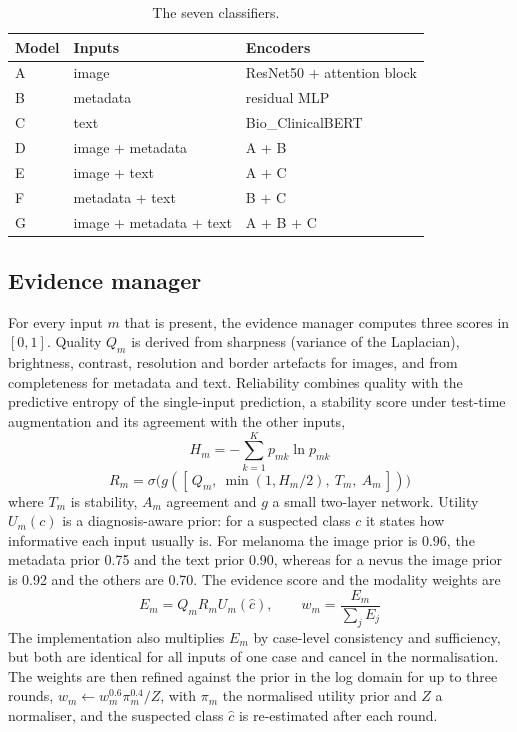 \documentclass[conference]{IEEEtran}
\begin{document}
\begin{table}[!t]
\caption{The seven classifiers.}
\label{tab:models}
\centering\scriptsize\setlength{\tabcolsep}{2.4pt}
\begin{tabular}{lll}
\toprule
Model & Inputs & Encoders \\
\midrule
A & image & ResNet50 + attention block \\
B & metadata & residual MLP \\
C & text & Bio\_ClinicalBERT \\
D & image + metadata & A + B \\
E & image + text & A + C \\
F & metadata + text & B + C \\
G & image + metadata + text & A + B + C \\
\bottomrule
\end{tabular}
\end{table}


\subsection{Evidence manager}
For every input $m$ that is present, the evidence manager computes three scores in $[0,1]$. Quality $Q_m$ is derived from sharpness (variance of the Laplacian), brightness, contrast, resolution and border artefacts for images, and from completeness for metadata and text. Reliability combines quality with the predictive entropy of the single-input prediction, a stability score under test-time augmentation and its agreement with the other inputs,
\begin{equation}
H_m=-\sum_{k=1}^{K}p_{mk}\ln p_{mk}
\label{eq:H}
\end{equation}
\begin{equation}
R_m=\sigma\!\bigl(g([\,Q_m,\ \min(1,H_m/2),\ T_m,\ A_m\,])\bigr)
\label{eq:R}
\end{equation}
where $T_m$ is stability, $A_m$ agreement and $g$ a small two-layer network. Utility $U_m(c)$ is a diagnosis-aware prior: for a suspected class $c$ it states how informative each input usually is. For melanoma the image prior is 0.96, the metadata prior 0.75 and the text prior 0.90, whereas for a nevus the image prior is 0.92 and the others are 0.70. The evidence score and the modality weights are
\begin{equation}
E_m=Q_mR_mU_m(\hat c),\qquad w_m=\frac{E_m}{\sum_j E_j}
\label{eq:E}
\end{equation}
The implementation also multiplies $E_m$ by case-level consistency and sufficiency, but both are identical for all inputs of one case and cancel in the normalisation. The weights are then refined against the prior in the log domain for up to three rounds, $w_m\leftarrow w_m^{0.6}\pi_m^{0.4}/Z$, with $\pi_m$ the normalised utility prior and $Z$ a normaliser, and the suspected class $\hat c$ is re-estimated after each round.
\end{document}
